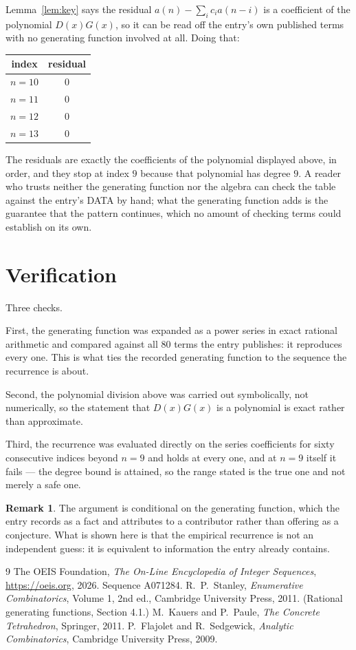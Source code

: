 \documentclass[11pt,a4paper]{article}
\theoremstyle{plain}
\theoremstyle{definition}
\newtheorem{remark}[theorem]{Remark}
\begin{document}
Lemma~\ref{lem:key} says the residual $a(n)-\sum_ic_ia(n-i)$ is a coefficient of the
polynomial $D(x)G(x)$, so it can be read off the entry's own published terms with no
generating function involved at all. Doing that:
\begin{center}
\begin{tabular}{cc}
index & residual \\ \hline
$n=10$ & $0$ \\
$n=11$ & $0$ \\
$n=12$ & $0$ \\
$n=13$ & $0$
\end{tabular}
\end{center}
The residuals are exactly the coefficients of the polynomial displayed above, in order, and
they stop at index $9$ because that polynomial has degree $9$. A reader who trusts
neither the generating function nor the algebra can check the table against the entry's DATA
by hand; what the generating function adds is the guarantee that the pattern continues, which
no amount of checking terms could establish on its own.

\section{Verification}

Three checks.

First, the generating function was expanded as a power series in exact rational arithmetic and
compared against all $80$ terms the entry publishes: it reproduces every one. This is
what ties the recorded generating function to the sequence the recurrence is about.

Second, the polynomial division above was carried out symbolically, not numerically, so the
statement that $D(x)G(x)$ is a polynomial is exact rather than approximate.

Third, the recurrence was evaluated directly on the series coefficients for sixty consecutive
indices beyond $n=9$ and holds at every one, and at $n=9$ itself it fails --- the
degree bound is attained, so the range stated is the true one and not merely a safe one.

\begin{remark}
The argument is conditional on the generating function, which the entry records as a fact and
attributes to a contributor rather than offering as a conjecture. What is shown here is that
the empirical recurrence is not an independent guess: it is equivalent to information the
entry already contains.
\end{remark}

\begin{thebibliography}{9}
 The OEIS Foundation, \emph{The On-Line Encyclopedia of Integer
Sequences}, \url{https://oeis.org}, 2026. Sequence A071284.
 R.~P.~Stanley, \emph{Enumerative Combinatorics}, Volume 1, 2nd ed.,
Cambridge University Press, 2011. (Rational generating functions, Section 4.1.)
 M.~Kauers and P.~Paule, \emph{The Concrete Tetrahedron}, Springer, 2011.
 P.~Flajolet and R.~Sedgewick, \emph{Analytic Combinatorics}, Cambridge
University Press, 2009.
\end{thebibliography}
\end{document}
